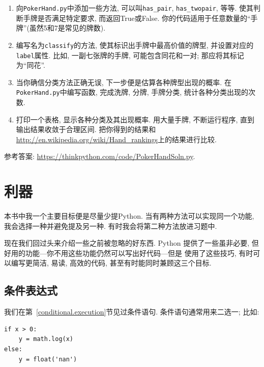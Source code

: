 \documentclass[10pt]{book}
\begin{document}
\begin{exercise}
\begin{enumerate}
\item 向{\tt PokerHand.py}中添加一些方法, 可以叫\verb"has_pair",
\verb"has_twopair", 等等. 使其判断手牌是否满足特定要求, 而返回True或False. 
你的代码适用于任意数量的``手牌''(虽然5和7是常见的牌数). 

\item 编写名为{\tt classify}的方法, 使其标识出手牌中最高价值的牌型, 
并设置对应的{\tt label}属性. 比如, 一副七张牌的手牌, 
可能包含同花和一对;
那应将其标记为``同花''.

\item 当你确信分类方法正确无误, 下一步便是估算各种牌型出现的概率. 
在{\tt PokerHand.py}中编写函数, 完成洗牌, 分牌, 手牌分类, 
统计各种分类出现的次数. 

\item 打印一个表格, 显示各种分类及其出现概率. 
用大量手牌, 不断运行程序, 直到输出结果收敛于合理区间. 
把你得到的结果和\url{http://en.wikipedia.org/wiki/Hand_rankings}上的结果进行比较. 

\end{enumerate}

参考答案: \url{https://thinkpython.com/code/PokerHandSoln.py}.
\end{exercise}


\chapter{利器}

本书中我一个主要目标便是尽量少提Python. 
当有两种方法可以实现同一个功能, 我会选择一种并避免提及另一种. 
有时我会将第二种方法放进习题中. 

现在我们回过头来介绍一些之前被忽略的好东西. 
Python 提供了一些虽非必要, 但好用的功能---你不用这些功能仍然可以写出好代码---但是
使用了这些技巧, 有时可以编写更简洁, 易读, 高效的代码, 甚至有时能同时兼顾这三个目标. 


\section{条件表达式}

我们在第~\ref{conditional.execution}节见过条件语句. 
条件语句通常用来二选一; 比如:

\begin{verbatim}
if x > 0:
    y = math.log(x)
else:
    y = float('nan')
\end{verbatim}
\end{document}
